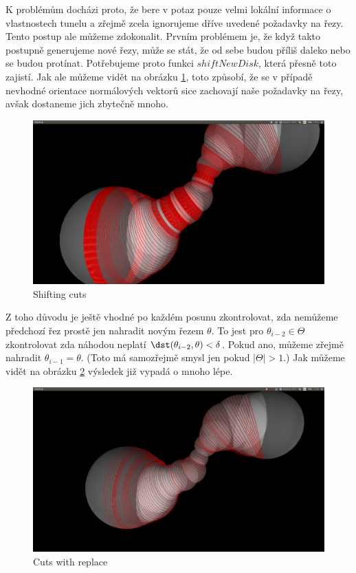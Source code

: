 K problémům docházi proto, že bere v potaz pouze velmi lokální informace o vlastnostech
tunelu a zřejmě zcela ignorujeme dříve uvedené požadavky na řezy. Tento postup ale
můžeme zdokonalit. Prvním problémem je, že když takto postupně generujeme nové řezy,
může se stát, že od sebe budou příliš daleko nebo se budou protínat. Potřebujeme proto
funkci $ shiftNewDisk $, která přesně toto zajistí. Jak ale můžeme vidět na obrázku
\ref{fig:shift_cuts}, toto způsobí, že se v případě nevhodné orientace normálových
vektorů sice zachovají naše požadavky na řezy, avšak dostaneme jich zbytečně mnoho.

\begin{figure}[ht]
    \centering
    \includegraphics[width=\textwidth]{img/shift_cuts.png}
    \caption{Shifting cuts}
  \centering
  \label{fig:shift_cuts}
\end{figure}

Z toho důvodu je ještě vhodné po každém posunu zkontrolovat, zda nemůžeme předchozí
řez prostě jen nahradit novým řezem $ \theta $. To jest pro
$ \theta_{i - 2} \in \Theta $ zkontrolovat zda náhodou neplatí
$ \dst(\theta_{i - 2}, \theta) < \delta $. Pokud ano, můžeme zřejmě nahradit
$ \theta_{i - 1} = \theta $. (Toto má samozřejmě smysl jen pokud
$ |\Theta| > 1 $.) Jak můžeme vidět na obrázku \ref{fig:cuts_with_replace}
výsledek již vypadá o mnoho lépe.

\begin{figure}[ht]
    \centering
    \includegraphics[width=\textwidth]{img/cuts_with_replace.png}
    \caption{Cuts with replace}
  \centering
  \label{fig:cuts_with_replace}
\end{figure}

